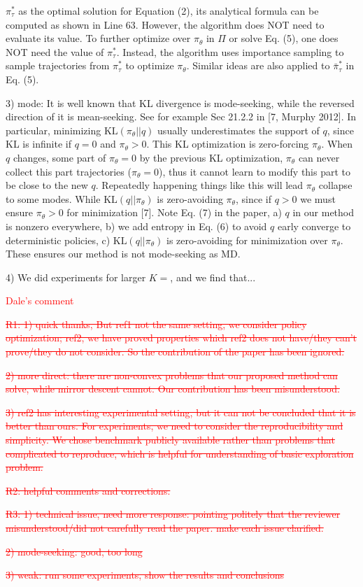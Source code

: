 \documentclass{article}
\begin{document}
$\pi_{\tau}^{*}$ as the optimal solution for Equation (2),  its analytical formula can be computed as shown in Line 63. However, the algorithm does NOT need to evaluate its value. To further optimize over $\pi_\theta$ in $\Pi$ or solve Eq. (5), one does NOT need the value of $\pi_{\tau}^{*}$. Instead, the algorithm uses importance sampling to sample trajectories from $\pi_{\tau}^{*}$ to optimize $\pi_\theta$. Similar ideas are also applied to $\bar{\pi}_\tau^*$ in Eq. (5). 

3) mode: It is well known that KL divergence is mode-seeking, while the reversed direction of it is mean-seeking. See for example Sec 21.2.2 in [7, Murphy 2012]. In particular, minimizing $\text{KL}(\pi_{\theta} || q)$ usually underestimates the support of $q$, since KL is infinite if $q = 0$ and $\pi_{\theta} > 0$. This KL optimization is zero-forcing $\pi_{\theta} $. When $q$ changes, some part of $\pi_{\theta} = 0$ by the previous KL optimization, $\pi_{\theta}$ can never collect this part trajectories ($\pi_{\theta} = 0$), thus it cannot learn to modify this part to be close to the new $q$. Repeatedly happening things like this will lead $\pi_{\theta}$ collapse to some modes. While $\text{KL}(q || \pi_{\theta})$ is zero-avoiding $\pi_{\theta}$, since if $q > 0$ we must ensure $\pi_{\theta} > 0$ for minimization [7]. Note Eq. (7) in the paper, a) $q$ in our method is nonzero everywhere, b) we add entropy in Eq. (6) to avoid $q$ early converge to deterministic policies, c) $\text{KL}(q || \pi_{\theta})$ is zero-avoiding for minimization over $\pi_{\theta}$. These ensures our method is not mode-seeking as MD.

4) We did experiments for larger $K = $, and we find that... 
\fi

\textcolor{red}{Dale's comment}

\textcolor{red}{
\sout{R1: 1) quick thanks, 
But ref1 not the same setting, we consider policy optimization; ref2, we have proved properties which ref2 does not have/they can't prove/they do not consider. So the contribution of the paper has been ignored.}}

\textcolor{red}{\sout{2) more direct: there are non-convex problems that our proposed method can solve, while mirror descent cannot. Our contribution has been misunderstood.}}

\textcolor{red}{\sout{3) ref2 has interesting experimental setting, but it can not be concluded that it is better than ours. For experiments, we need to consider the reproducibility and simplicity. We chose benchmark publicly available rather than problems that complicated to reproduce, which is helpful for understanding of basic exploration problem.}}

\textcolor{red}{\sout{R2: helpful comments and corrections.}}

\textcolor{red}{
\sout{R3:
1) technical issue, need more response: pointing politely that the reviewer misunderstood/did not carefully read the paper. make each issue clarified.
}}

\textcolor{red}{
\sout{2) mode-seeking: good, too long
}}

\textcolor{red}{
\sout{3) weak: run some experiments, show the results and conclusions
}}
\end{document}
